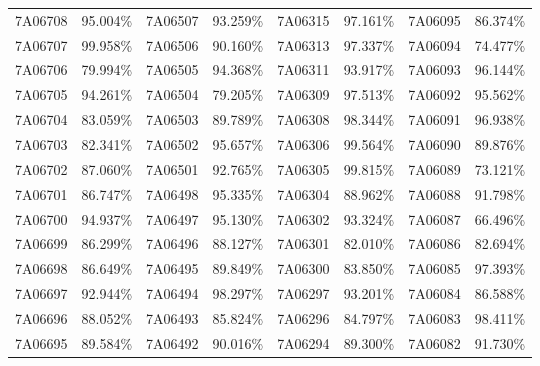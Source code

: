 \documentclass[12pt]{article}%
\begin{document}
\begin{longtable}{|cc|cc|cc|cc|}
7A06708              & 95.004\% & 7A06507              & 93.259\% & 7A06315              & 97.161\% & \multicolumn{1}{l}{7A06095             } & 86.374\% \\
7A06707              & 99.958\% & 7A06506              & 90.160\% & 7A06313              & 97.337\% & \multicolumn{1}{l}{7A06094             } & 74.477\% \\
7A06706              & 79.994\% & 7A06505              & 94.368\% & 7A06311              & 93.917\% & \multicolumn{1}{l}{7A06093             } & 96.144\% \\
7A06705              & 94.261\% & 7A06504              & 79.205\% & 7A06309              & 97.513\% & \multicolumn{1}{l}{7A06092             } & 95.562\% \\
7A06704              & 83.059\% & 7A06503              & 89.789\% & 7A06308              & 98.344\% & \multicolumn{1}{l}{7A06091             } & 96.938\% \\
7A06703              & 82.341\% & 7A06502              & 95.657\% & 7A06306              & 99.564\% & \multicolumn{1}{l}{7A06090             } & 89.876\% \\
7A06702              & 87.060\% & 7A06501              & 92.765\% & 7A06305              & 99.815\% & \multicolumn{1}{l}{7A06089             } & 73.121\% \\
7A06701              & 86.747\% & 7A06498              & 95.335\% & 7A06304              & 88.962\% & \multicolumn{1}{l}{7A06088             } & 91.798\% \\
7A06700              & 94.937\% & 7A06497              & 95.130\% & 7A06302              & 93.324\% & \multicolumn{1}{l}{7A06087             } & 66.496\% \\
7A06699              & 86.299\% & 7A06496              & 88.127\% & 7A06301              & 82.010\% & \multicolumn{1}{l}{7A06086             } & 82.694\% \\
7A06698              & 86.649\% & 7A06495              & 89.849\% & 7A06300              & 83.850\% & \multicolumn{1}{l}{7A06085             } & 97.393\% \\
7A06697              & 92.944\% & 7A06494              & 98.297\% & 7A06297              & 93.201\% & \multicolumn{1}{l}{7A06084             } & 86.588\% \\
7A06696              & 88.052\% & 7A06493              & 85.824\% & 7A06296              & 84.797\% & \multicolumn{1}{l}{7A06083             } & 98.411\% \\
7A06695              & 89.584\% & 7A06492              & 90.016\% & 7A06294              & 89.300\% & \multicolumn{1}{l}{7A06082             } & 91.730\% \\

\end{longtable}
\end{document}
